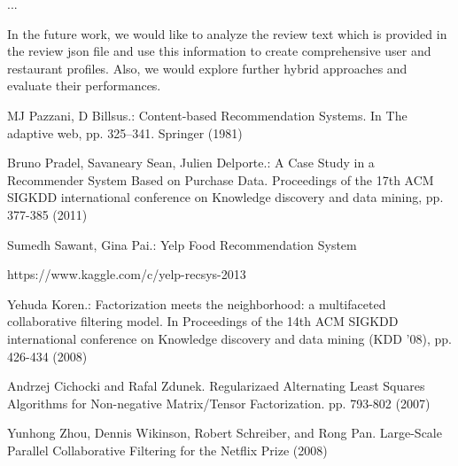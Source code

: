 \documentclass{llncs}
\begin{document}
 ...
 
 In the future work, we would like to analyze the review text which is provided in the review json file and use this information to create comprehensive user and restaurant profiles. Also, we would explore further hybrid approaches and evaluate their performances.

%
%
\begin{thebibliography}{5}
%
MJ Pazzani, D Billsus.:
Content-based Recommendation Systems. In The adaptive web, pp. 325–341. Springer (1981) 

Bruno Pradel, Savaneary Sean, Julien Delporte.: 
A Case Study in a Recommender System Based on Purchase Data. Proceedings of the 17th ACM SIGKDD international conference on Knowledge discovery and data mining, pp. 377-385 (2011)

Sumedh Sawant, Gina Pai.:
Yelp Food Recommendation System

https://www.kaggle.com/c/yelp-recsys-2013

Yehuda Koren.: 
Factorization meets the neighborhood: a multifaceted collaborative filtering model. In Proceedings of the 14th ACM SIGKDD international conference on Knowledge discovery and data mining (KDD '08), pp. 426-434 (2008)

Andrzej Cichocki and Rafal Zdunek. Regularizaed Alternating Least Squares Algorithms for Non-negative Matrix/Tensor Factorization. pp. 793-802 (2007)

Yunhong Zhou, Dennis Wikinson, Robert Schreiber, and Rong Pan. Large-Scale Parallel Collaborative Filtering for the Netflix Prize (2008)


\end{thebibliography}
\end{document}
